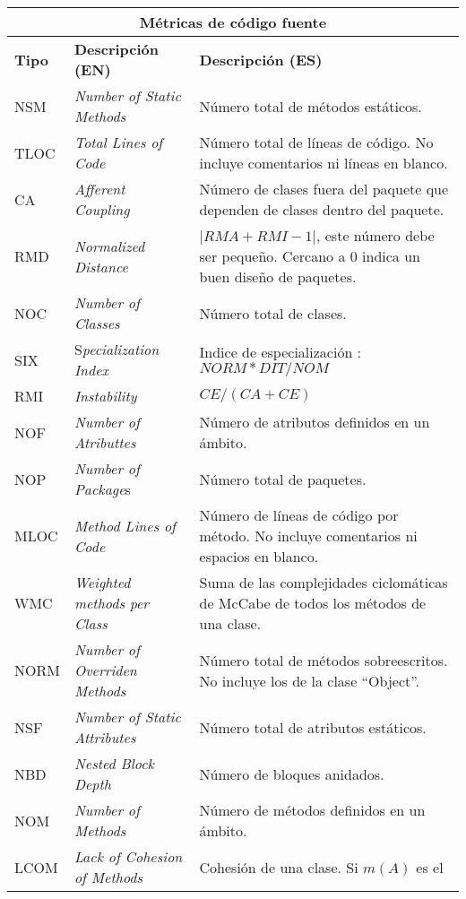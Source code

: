    \begin{longtable}{|p{2cm}|p{3cm}|p{8cm}|}

      \hline 
	    \multicolumn{3}{|c|}{\textbf{Métricas de código fuente}}\\ \hline
	     \textbf{Tipo} &  \textbf{Descripción (EN)} &  \textbf{Descripción (ES)} \\ \hline
      \endhead
			NSM&\textit{Number of Static Methods} & Número total de métodos estáticos.\\ \hline
			TLOC&\textit{Total Lines of Code}&Número total de líneas de código. No incluye
			comentarios ni líneas en blanco.\\ \hline 
			CA&\textit{Afferent Coupling} &Número de clases fuera del paquete que dependen de
			clases dentro del paquete.\\ \hline 
			RMD&\textit{Normalized Distance} & $|RMA + RMI - 1 |$, este número debe ser pequeño.
			Cercano a 0 indica un buen diseño de paquetes.\\ \hline
			NOC&\textit{Number of Classes}& Número total de clases.\\ \hline
			SIX&S\textit{pecialization Index} &Indice de especialización :$NORM * DIT / NOM$\\			\hline 
			RMI&\textit{Instability} & $CE / (CA + CE)$\\ \hline
			NOF&\textit{Number of Atributtes} &Número de atributos definidos en un ámbito.\\ \hline
			NOP&\textit{Number of Package}s& Número  total de paquetes.\\ \hline
			MLOC&\textit{Method Lines of Code} & Número de líneas de código por método. No incluye
			comentarios ni espacios en blanco.\\ \hline
			WMC&\textit{Weighted methods per Class}& Suma de las complejidades ciclomáticas de
			McCabe de todos los métodos de una clase. \\ \hline 
			NORM&\textit{Number of Overriden Methods}&Número total de métodos sobreescritos. No
			incluye los de la clase ``Object''. \\ \hline 
			NSF&\textit{Number of Static Attributes} & Número total de atributos estáticos.\\ \hline
			NBD&\textit{Nested Block Depth} & Número de bloques anidados.\\ \hline
			NOM&\textit{Number of Methods} & Número de métodos definidos en un ámbito.\\ \hline
			LCOM&\textit{Lack of Cohesion of Methods}& Cohesión de una clase. Si $m(A)$ es el

\end{longtable}
